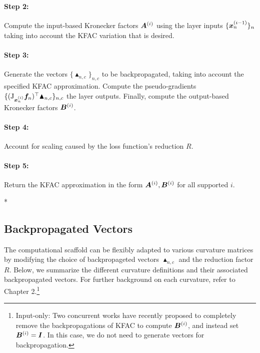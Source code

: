 \paragraph{Step 2:} Compute the input-based Kronecker factors ${\bm{A}}^{(i)}$ using the layer inputs $\{{\bm{x}}_n^{(i-1)}\}_n$ taking into account the KFAC variation that is desired.

\paragraph{Step 3:} Generate the vectors $\{\blacktriangle_{n,c}\}_{n,c}$ to be backpropagated, taking into account the specified KFAC approximation. Compute the pseudo-gradients $\{(\mathrm{J}_{{\bm{x}}_n^{(i)}} {\bm{f}}_n)^{\top} \blacktriangle_{n,c} \}_{n,c}$ \wrt the layer outputs. Finally, compute the output-based Kronecker factors ${\bm{B}}^{(i)}$.%

\paragraph{Step 4:} Account for scaling caused by the loss function's reduction $R$.

\paragraph{Step 5:} Return the KFAC approximation in the form ${\bm{A}}^{(i)}, {\bm{B}}^{(i)}$ for all supported $i$.

\switchcolumn[1]*
\switchcolumn[0]

\subsection{Backpropagated Vectors}
The computational scaffold can be flexibly adapted to various curvature matrices by modifying the choice of backpropageted vectors $\blacktriangle_{n,c}$ and the reduction factor $R$. Below, we summarize the different curvature definitions and their associated backpropagated vectors. For further background on each curvature, refer to Chapter 2.\footnote{Input-only: Two concurrent works have recently proposed to completely remove the backpropagations of KFAC to compute ${\bm{B}}^{(i)}$, and instead set ${\bm{B}}^{(i)} = {\bm{I}}$. In this case, we do not need to generate vectors for backpropagation.
}

